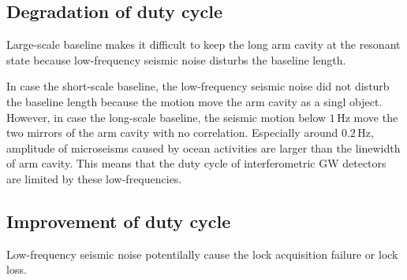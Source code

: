 

\subsection{Degradation of duty cycle }
Large-scale baseline makes it difficult to keep the long arm cavity at the resonant state because low-frequency seismic noise disturbs the baseline length.

In case the short-scale baseline, the low-frequency seismic noise did not disturb the baseline length because the motion move the arm cavity as a singl object. However, in case the long-scale baseline, the seismic motion below $1\,\mathrm{Hz}$ move the two mirrors of the arm cavity with no correlation. Especially around $0.2\,\mathrm{Hz}$, amplitude of microseisms caused by ocean activities are larger than the linewidth of arm cavity. This means that the duty cycle of interferometric GW detectors are limited by these low-frequencies.

\subsection{Improvement of duty cycle}
Low-frequency seismic noise potentilally cause the lock acquisition failure or lock loss. 

